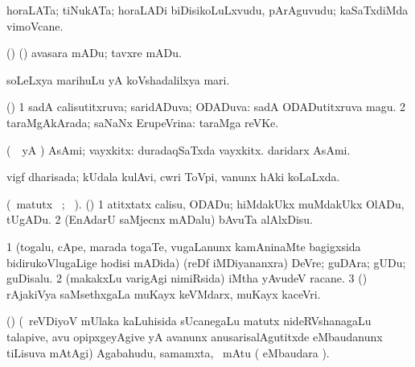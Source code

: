 \bentry
{}
\gl{\nA}
\bmng
horaLATa; tiNukATa; horaLADi biDisikoLuLxvudu, pArAguvudu; kaSaTxdiMda vimoVcane. 
\emng

\noindent 
\gl{\pagu}
\bmng
{} (\ame) (\ashi) avasara mADu; tavxre mADu. 
\emng
\eentry

\bentry 
{}
\gl{\nA}
\bmng
soLeLxya marihuLu yA koVshadalilxya mari. 
\emng
\eentry

\bentry
{} 
\gl{\gu}
\bmng
(\AmA) 
\bnum
\num{1} sadA calisutitxruva; saridADuva; ODADuva:  sadA ODADutitxruva magu. 
\num{2} taraMgAkArada; saNaNx ErupeVrina:  taraMga reVKe. 
\enum
\emng
\eentry

\bentry
{}
\gl{\nA}
\bmng
(\pArxparx\ \hA\ yA \pArxM) AsAmi; vayxkitx:  duradaqSaTxda vayxkitx.  daridarx AsAmi. 
\emng
\eentry

\bentry
{}
\gl{\gu}
\bmng
vigf dharisada; kUdala kulAvi, cwri ToVpi, \mo vanunx hAki koLaLxda. 
\emng
\eentry

\bentry
{}
\gl{\kirx} 
 (\BU\ matutx \BUkaq\ ; \vakaq\ ). 
\bmng
(\AmA) 
\bnum
\num{1} atitxtatx calisu, ODADu; hiMdakUkx muMdakUkx OlADu, tUgADu. 
\num{2} (EnAdarU saMjecnx mADalu) bAvuTa alAlxDisu. 
\enum
\emng
\eentry

\bentry
{}
\gl{\nA}
\bmng
\bnum
\num{1} (togalu, cApe, marada togaTe, \mo vugaLanunx kamAninaMte bagigxsida bidirukoVlugaLige hodisi mADida) (reDf iMDiyananxra) DeVre; guDAra; gUDu; guDisalu. 
\num{2} (makakxLu \mo varigAgi nimiRsida) iMtha yAvudeV racane. 
\num{3} (\ame) rAjakiVya saMsethxgaLa muKayx keVMdarx, muKayx kaceVri. 
\enum
\emng
\eentry

\bentry
{}
\gl{\BAavayx}
\bmng
(\AmA) (\kanmu\ reVDiyoV mUlaka kaLuhisida sUcanegaLu matutx nideRVshanagaLu talapive, avu opipxgeyAgive yA avanunx anusarisalAgutitxde eMbaudanunx tiLisuva mAtAgi) Agabahudu, samamxta, \mo\ mAtu ( eMbaudara \saMkiSx). 
\emng
\eentry

